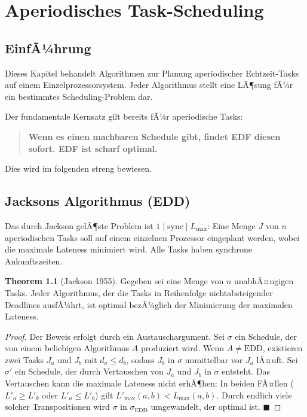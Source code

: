 ﻿\documentclass[a4paper,12pt]{report}
\theoremstyle{definition}
\newtheorem{theorem}{Theorem}[chapter]
\begin{document}
\chapter{Aperiodisches Task-Scheduling}
\label{chap:aperiodisch}

\section{EinfÃ¼hrung}

Dieses Kapitel behandelt Algorithmen zur Planung aperiodischer Echtzeit-Tasks
auf einem Einzelprozessorsystem. Jeder Algorithmus stellt eine LÃ¶sung fÃ¼r ein
bestimmtes Scheduling-Problem dar.

Der fundamentale Kernsatz gilt bereits fÃ¼r aperiodische Tasks:

\begin{quote}
\textbf{Wenn es einen machbaren Schedule gibt, findet EDF diesen sofort. EDF ist scharf optimal.}
\end{quote}

Dies wird im folgenden streng bewiesen.

\section{Jacksons Algorithmus (EDD)}

Das durch Jackson gelÃ¶ste Problem ist $1 \mid \text{sync} \mid L_{\max}$: Eine Menge
$J$ von $n$ aperiodischen Tasks soll auf einem einzelnen Prozessor eingeplant werden,
wobei die maximale Lateness minimiert wird. Alle Tasks haben synchrone Ankunftszeiten.

\begin{theorem}[Jackson 1955]
	\label{thm:jackson}
	Gegeben sei eine Menge von $n$ unabhÃ¤ngigen Tasks. Jeder Algorithmus, der die
	Tasks in Reihenfolge nichtabsteigender Deadlines ausfÃ¼hrt, ist optimal bezÃ¼glich
	der Minimierung der maximalen Lateness.
\end{theorem}

\begin{proof}
	Der Beweis erfolgt durch ein Austauschargument. Sei $\sigma$ ein Schedule, der
	von einem beliebigen Algorithmus $A$ produziert wird. Wenn $A \neq \text{EDD}$,
	existieren zwei Tasks $J_a$ und $J_b$ mit $d_a \leq d_b$, sodass $J_b$ in
	$\sigma$ unmittelbar vor $J_a$ lÃ¤uft. Sei $\sigma'$ ein Schedule, der durch
	Vertauschen von $J_a$ und $J_b$ in $\sigma$ entsteht. Das Vertauschen kann die
	maximale Lateness nicht erhÃ¶hen: In beiden FÃ¤llen ($L'_a \geq L'_b$ oder
	$L'_a \leq L'_b$) gilt $L'_{\max}(a,b) < L_{\max}(a,b)$. Durch endlich viele
	solcher Transpositionen wird $\sigma$ in $\sigma_{\text{EDD}}$ umgewandelt, der
	optimal ist. \hfill$\blacksquare$
\end{proof}
\end{document}
